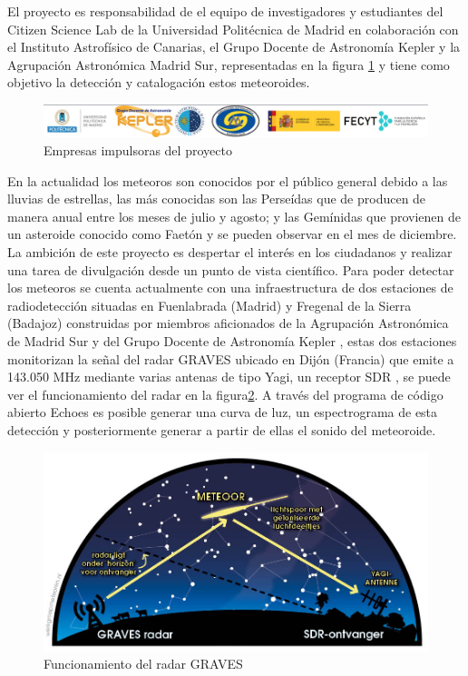 El proyecto es responsabilidad de el equipo de investigadores y estudiantes del Citizen Science Lab de la Universidad Politécnica de Madrid en colaboración con el Instituto Astrofísico de Canarias, el Grupo Docente de Astronomía Kepler y la Agrupación Astronómica Madrid Sur, representadas en la figura \ref{fig:empresas} y tiene como objetivo la detección y catalogación estos meteoroides.

\begin{figure} [h]
    \centering
    \includegraphics[width=\textwidth]{include/figuras/Empresas_proyecto.png}
    \caption{Empresas impulsoras del proyecto}
    \label{fig:empresas}
\end{figure}

En la actualidad los meteoros son conocidos por el público general debido a las lluvias de estrellas, las más conocidas son las Perseídas que de producen de manera anual entre los meses de julio y agosto; y las Gemínidas que provienen de un asteroide conocido como Faetón y se pueden observar en el mes de diciembre. La ambición de este proyecto es despertar el interés en los ciudadanos y realizar una tarea de divulgación desde un punto de vista científico. 
Para poder detectar los meteoros se cuenta actualmente con una infraestructura de dos estaciones de radiodetección situadas en Fuenlabrada (Madrid) y Fregenal de la Sierra (Badajoz) construidas por miembros aficionados de la Agrupación Astronómica de Madrid Sur y del Grupo Docente de Astronomía Kepler \cite{kepler}, estas dos estaciones monitorizan la señal del radar GRAVES \cite{graves} ubicado en Dijón (Francia) que emite a 143.050 MHz mediante varias antenas de tipo Yagi, un receptor SDR \cite{ulversoy2010software}, se puede ver el funcionamiento del radar en la figura\ref{fig:radar}. A través del programa de código abierto Echoes \cite{echoes} es posible generar una curva de luz, un espectrograma de esta detección y posteriormente generar a partir de ellas el sonido del meteoroide. 

\begin{figure} [h]
    \centering
    \includegraphics[scale=0.35]{include/figuras/Radar.jpg}
    \caption{Funcionamiento del radar GRAVES}
    \label{fig:radar}
\end{figure}

